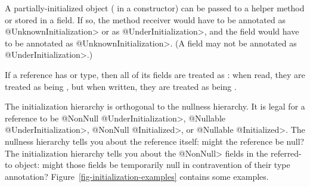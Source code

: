   A partially-initialized object ( in a constructor) can be
  passed to a helper method or stored in a field.  If so, the method
  receiver would have to be annotated as \<@UnknownInitialization> or as
  \<@UnderInitialization>, and the field would have to be annotated as
  \<@UnknownInitialization>.  (A field may not be annotated as
  \<@UnderInitialization>.)


If a reference has
 or  type, then all of its  fields are treated as
:  when read, they are
treated as being , but when
written, they are treated as being
.

\begin{sloppypar}
The initialization hierarchy is orthogonal to the nullness hierarchy.  It
is legal for a reference to be \<@NonNull @UnderInitialization>, \<@Nullable @UnderInitialization>,
\<@NonNull @Initialized>, or \<@Nullable @Initialized>.  The nullness hierarchy tells
you about the reference itself:  might the reference be null?  The initialization
hierarchy tells you about the \<@NonNull> fields in the referred-to object:
might those fields be temporarily null in contravention of their
type annotation?
Figure~\ref{fig-initialization-examples} contains some examples.
\end{sloppypar}


